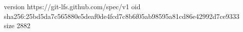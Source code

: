 version https://git-lfs.github.com/spec/v1
oid sha256:25bd5da7c565880e5deaf0de4fcd7c8b6f05ab98595a81cd86e42992d7ce9333
size 2882
